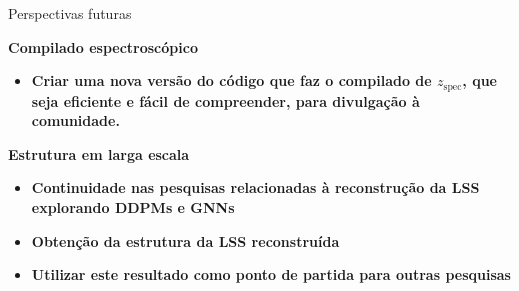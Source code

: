 \begin{frame}[c]{Perspectivas futuras}
    \begin{splusbox}{\textbf{Compilado espectroscópico}}
        \small
        \begin{itemize}
            \item \textbf{Criar uma nova versão do código que faz o compilado de $z_\text{spec}$, que seja eficiente e fácil de compreender, para divulgação à comunidade.}
        \end{itemize}
    \end{splusbox}

    \begin{splusbox}{\textbf{Estrutura em larga escala}}
        \small
        \begin{itemize}
            \item \textbf{Continuidade nas pesquisas relacionadas à reconstrução da LSS explorando DDPMs e GNNs}
            \item \textbf{Obtenção da estrutura da LSS reconstruída}
            \item \textbf{Utilizar este resultado como ponto de partida para outras pesquisas}
        \end{itemize}
    \end{splusbox}
\end{frame}


\appendix




